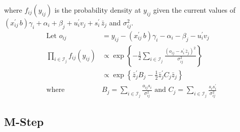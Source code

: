 \begin{enumerate}
where $f_{ij}(y_{ij})$ is the probability density at $y_{ij}$ given the current values of $(x_{ij}^{\prime}\, b) \gamma_i  + \alpha_i + \beta_j + u_i^\prime v_j + s_{i}^{\prime} \, \bar{z}_{j}$ and $\sigma_{ij}^2$.
\begin{equation}
\begin{split}
\mbox{Let } o_{ij} 
	&= y_{ij} - (x_{ij}^{\prime}\, b) \gamma_i  - 
		\alpha_i - \beta_j - u_i^\prime v_j \\
\prod_{i\in \mathcal{I}_j} f_{ij}(y_{ij}) 
	&\propto \exp\left\{ 
			-\frac{1}{2} \sum_{i \in \mathcal{I}_j}
				\frac{(o_{ij} -  s_{i}^{\prime} \, \bar{z}_{j})^2}{\sigma_{ij}^2}
		\right\} \\
	&\propto \exp\left\{
			\bar{z}_{j}^\prime B_j - 
			\frac{1}{2} \bar{z}_{j}^\prime C_j \bar{z}_{j}
		\right\} \\
\mbox{where } & 
	B_j = \sum_{i \in \mathcal{I}_j} \frac{o_{ij} s_i}{\sigma_{ij}^{2}}
	\mbox{ and }
	C_j = \sum_{i \in \mathcal{I}_j} \frac{s_i s_i^{\prime}}{\sigma_{ij}^{2}}
\end{split}
\end{equation}
\end{enumerate}

\subsection{M-Step}

